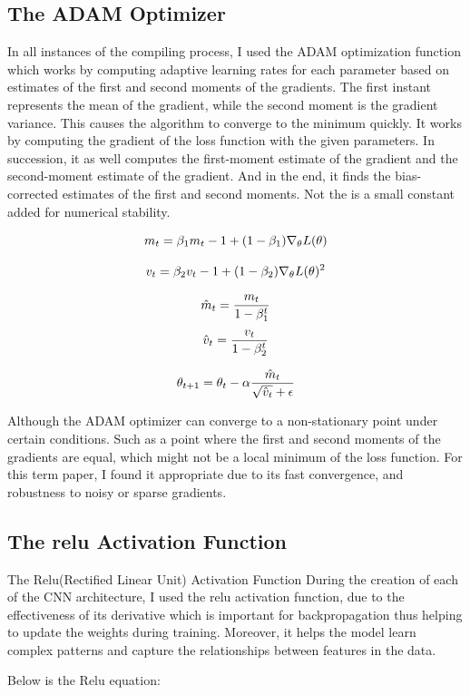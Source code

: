 \documentclass{article}
\begin{document}
\subsection{The ADAM Optimizer}
In all instances of the compiling process, I used the ADAM optimization function which works by computing adaptive learning rates for each parameter based on estimates of the first and second moments of the gradients.\cite{reddi2019convergence} The first instant represents the mean of the gradient, while the second moment is the gradient variance. This causes the algorithm to converge to the minimum quickly.
It works by computing the gradient of the loss function with the given parameters. \cite{kingma2014method} In succession, it as well computes the first-moment estimate of the gradient and the second-moment estimate of the gradient. And in the end, it finds the bias-corrected estimates of the first and second moments. Not the  is a small constant added for numerical stability.


\[m_t = \beta_1m_t-1 + (1-\beta_1)\nabla_\theta L(\theta)\]

\[v_t = \beta_2v_t-1 + (1-\beta_2)\nabla_\theta L(\theta)^2\]

\[\hat{m}_t = \frac{m_t}{1-\beta_1^t}\]
\[\hat{v}_t = \frac{v_t}{1-\beta_2^t}\]

\[\theta_{t+1} = \theta_t - \alpha\frac{\hat{m}_t}{\sqrt{\hat{v}_t} + \epsilon}\]

Although the ADAM optimizer can converge to a non-stationary point under certain conditions.\cite{ruder2016overview} Such as a point where the first and second moments of the gradients are equal, which might not be a local minimum of the loss function. For this term paper, I found it appropriate due to its fast convergence, and robustness to noisy or sparse gradients.

\subsection{The relu Activation Function}
The Relu(Rectified Linear Unit) Activation Function
During the creation of each of the CNN architecture, I used the relu activation function, due to the effectiveness of its derivative which is important for backpropagation thus helping to update the weights during training. Moreover, it helps the model learn complex patterns and capture the relationships between features in the data.

Below is the Relu equation:\\
\end{document}
